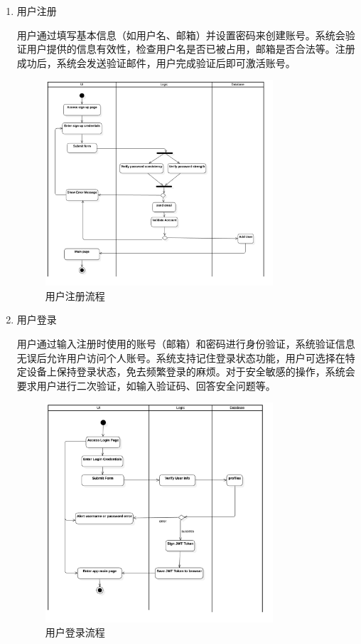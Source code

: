 \documentclass[
    report,     %
    oneside,    %
    UTF8,       %
    zihao=-4    %
]{config} %
\begin{document}
\begin{enumerate}[label=(\arabic*)]
    \item 用户注册
    
    用户通过填写基本信息（如用户名、邮箱）并设置密码来创建账号。系统会验证用户提供的信息有效性，检查用户名是否已被占用，邮箱是否合法等。注册成功后，系统会发送验证邮件，用户完成验证后即可激活账号。
    \begin{figure}[H]
        \centering
        \includegraphics[width=0.8\textwidth]{UML/Activity/signup.png}
        \caption{用户注册流程}
        \label{fig:UserRegistrationFlow}
    \end{figure}
     
    \item 用户登录
    
    用户通过输入注册时使用的账号（邮箱）和密码进行身份验证，系统验证信息无误后允许用户访问个人账号。系统支持记住登录状态功能，用户可选择在特定设备上保持登录状态，免去频繁登录的麻烦。对于安全敏感的操作，系统会要求用户进行二次验证，如输入验证码、回答安全问题等。
    \begin{figure}[H]
        \centering
        \includegraphics[width=0.8\textwidth]{UML/Activity/login.png}
        \caption{用户登录流程}
        \label{fig:UserLoginProcess}
    \end{figure}
    

\end{enumerate}
\end{document}
